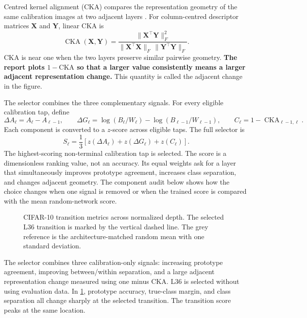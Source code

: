 Centred kernel alignment (CKA) compares the representation geometry of the
same calibration images at two adjacent layers \cite{kornblith2019cka}.
For column-centred descriptor matrices $\bm X$ and $\bm Y$, linear CKA is
\begin{equation}
    \operatorname{CKA}(\bm X,\bm Y)
    =
    \frac{\|\bm X^{\top}\bm Y\|_F^2}
    {\|\bm X^{\top}\bm X\|_F\,\|\bm Y^{\top}\bm Y\|_F}.
    \label{eq:pca-linear-cka}
\end{equation}
CKA is near one when the two layers preserve similar pairwise geometry.
\textbf{The report plots $1-\mathrm{CKA}$ so that a larger value consistently
means a larger adjacent representation change.} This quantity is called the
adjacent change in the figure.

The selector combines the three complementary signals. For every eligible
calibration tap, define
\begin{equation}
    \Delta A_\ell=A_\ell-A_{\ell-1},\qquad
    \Delta G_\ell=\log(B_\ell/W_\ell)-\log(B_{\ell-1}/W_{\ell-1}),
    \qquad C_\ell=1-\operatorname{CKA}_{\ell-1,\ell}.
\end{equation}
Each component is converted to a $z$-score across eligible taps. The full
selector is
\begin{equation}
    S_\ell
    =\frac{1}{3}
    \left[z(\Delta A_\ell)+z(\Delta G_\ell)+z(C_\ell)\right].
    \label{eq:pca-transition-selector}
\end{equation}
The highest-scoring non-terminal calibration tap is selected. The score is a
dimensionless ranking value, not an accuracy. Its equal weights ask for a layer
that simultaneously improves prototype agreement, increases class separation,
and changes adjacent geometry. The component audit below shows how the choice
changes when one signal is removed or when the trained score is compared with
the mean random-network score.

\begin{figure}[!htbp]
    \centering
    \caption{CIFAR-10 transition metrics across normalized depth. The selected
    L36 transition is marked by the vertical dashed line. The grey reference is
    the architecture-matched random mean with one standard deviation.}
    \label{fig:pca-cifar10-transition}
\end{figure}

The selector combines three calibration-only signals: increasing prototype
agreement, improving between/within separation, and a large adjacent
representation change measured using one minus CKA. L36 is selected without
using evaluation data. In \cref{fig:pca-cifar10-transition}, prototype accuracy,
true-class margin, and class separation all change sharply at the selected
transition. The transition score peaks at the same location.

